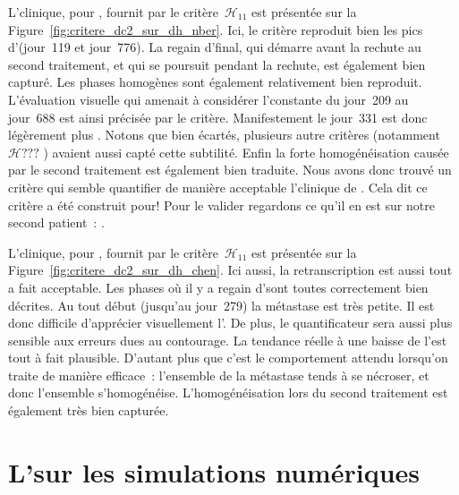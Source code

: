 \documentclass[main.tex]{subfiles}
\begin{document}
L'\hetero clinique, pour \Nber, fournit par le critère~$\mathcal{H}_{11}$ est présentée sur la Figure~\ref{fig:critere_dc2_sur_dh_nber}. Ici, le critère reproduit bien les pics d'\heteros (jour~119 et jour~776). La regain d'\hetero final, qui démarre avant la rechute au second traitement, et qui se poursuit pendant la rechute, est également bien capturé. Les phases homogènes sont également relativement bien reproduit. L'évaluation visuelle qui amenait à considérer l'\hetero constante du jour~209 au jour~688 est ainsi précisée par le critère. Manifestement le jour~331 est donc légèrement plus \hetero. Notons que bien écartés, plusieurs autre critères (notamment~$\mathcal{H}???$ ) 
avaient aussi capté cette subtilité. Enfin la forte homogénéisation causée par le second traitement est également bien traduite.
Nous avons donc trouvé un critère qui semble quantifier de manière acceptable l'\hetero clinique de \Nber. Cela dit ce critère a été construit pour! Pour le valider regardons ce qu'il en est sur notre second patient~: \Chen.


L'\hetero clinique, pour \Chen, fournit par le critère~$\mathcal{H}_{11}$ est présentée sur la Figure~\ref{fig:critere_dc2_sur_dh_chen}. Ici aussi, la retranscription est aussi tout a fait acceptable. Les phases où il y a regain d'\hetero sont toutes correctement bien décrites. Au tout début (jusqu'au jour~279) la métastase est très petite. Il est donc difficile d'apprécier visuellement l'\hetero. De plus, le quantificateur sera aussi plus sensible aux erreurs dues au contourage. La tendance réelle à une baisse de l'\hetero est tout à fait plausible. D'autant plus que c'est le comportement attendu lorsqu'on traite de manière efficace~: l'ensemble de la métastase tends à se nécroser, et donc l'ensemble s'homogénéise.
L'homogénéisation lors du second traitement est également très bien capturée.
\section{L'\hetero sur les simulations numériques}
\end{document}
